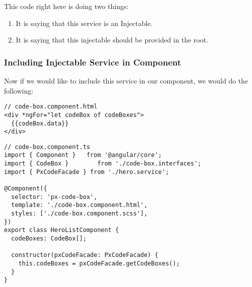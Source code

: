 This code right here is doing two things:
\begin{enumerate}
  \item It is saying that this service is an Injectable.
  \item It is saying that this injectable should be provided in the root.
\end{enumerate}


\subsubsection{ Including Injectable Service in Component }
Now if we would like to include this service in our component, we would do the
following:
\begin{lstlisting}
// code-box.component.html
<div *ngFor="let codeBox of codeBoxes">
  {{codeBox.data}}
</div>
\end{lstlisting}

\begin{lstlisting}
// code-box.component.ts
import { Component }   from '@angular/core';
import { CodeBox }        from './code-box.interfaces';
import { PxCodeFacade } from './hero.service';

@Component({
  selector: 'px-code-box',
  template: './code-box.component.html',
  styles: ['./code-box.component.scss'],
})
export class HeroListComponent {
  codeBoxes: CodeBox[];

  constructor(pxCodeFacade: PxCodeFacade) {
    this.codeBoxes = pxCodeFacade.getCodeBoxes();
  }
}
\end{lstlisting}

